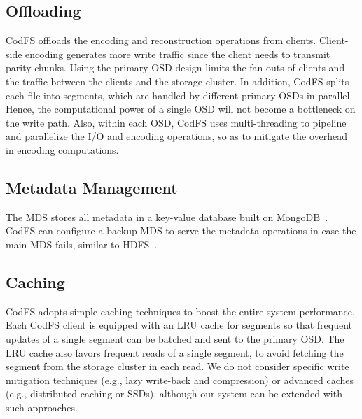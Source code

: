 \subsection{Offloading} 
CodFS offloads the encoding and reconstruction operations from clients. 
Client-side encoding generates more write traffic 
since the client needs to transmit parity chunks.  Using the primary
OSD design limits the fan-outs of clients and the traffic between the
clients and the storage cluster.  In addition, CodFS splits each file into
segments, which are handled by different primary OSDs in parallel.  Hence, the
computational power of a single OSD will not become a bottleneck on the write
path.  Also, within each OSD, CodFS uses multi-threading to pipeline and
parallelize the I/O and encoding operations, so as to mitigate the overhead
in encoding computations. 

\subsection{Metadata Management} The MDS stores all metadata in a
key-value database built on MongoDB~\cite{mongodb}. CodFS can configure a
backup MDS to serve the metadata operations in case the main MDS fails,
similar to HDFS~\cite{hdfs_architecture}. 

\subsection{Caching} CodFS adopts simple caching techniques to boost the entire
system performance.  Each CodFS client is equipped with an LRU cache for
segments so that frequent updates of a single segment can be batched and sent
to the primary OSD. 
The LRU cache also favors frequent reads of a single segment, to avoid
fetching the segment from the storage cluster in each read.  We do not
consider specific write mitigation techniques (e.g., lazy write-back and
compression) or advanced caches (e.g., distributed caching or SSDs), although
our system can be extended with such approaches. 

